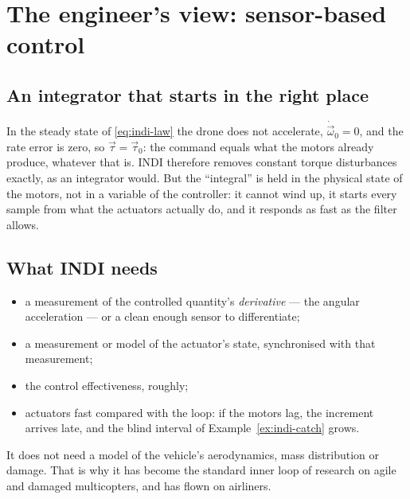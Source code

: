 \section{The engineer's view: sensor-based control}

\subsection{An integrator that starts in the right place}
In the steady state of \cref{eq:indi-law} the drone does not accelerate, $\dot{\vec\omega}_0 = 0$, and the rate error is zero, so $\vec\tau = \vec\tau_0$: the command equals what the motors already produce, whatever that is. INDI therefore removes constant torque disturbances exactly, as an integrator would. But the \enquote{integral} is held in the physical state of the motors, not in a variable of the controller: it cannot wind up, it starts every sample from what the actuators actually do, and it responds as fast as the filter allows.

\subsection{What INDI needs}
\begin{itemize}
  \item a measurement of the controlled quantity's \emph{derivative} — the angular acceleration — or a clean enough sensor to differentiate;
  \item a measurement or model of the actuator's state, synchronised with that measurement;
  \item the control effectiveness, roughly;
  \item actuators fast compared with the loop: if the motors lag, the increment arrives late, and the blind interval of Example~\ref{ex:indi-catch} grows.
\end{itemize}
It does not need a model of the vehicle's aerodynamics, mass distribution or damage. That is why it has become the standard inner loop of research on agile and damaged multicopters, and has flown on airliners.

